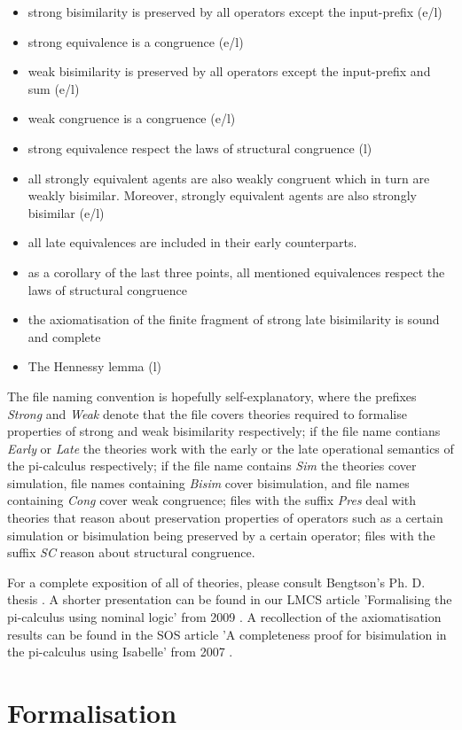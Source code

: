 \documentclass[11pt,a4paper]{article}
\begin{document}
\begin{itemize}
\item strong bisimilarity is preserved by all operators except the
  input-prefix (e/l)
\item strong equivalence is a congruence (e/l)
\item weak bisimilarity is preserved by all operators except the
  input-prefix and sum (e/l)
\item weak congruence is a congruence (e/l)
\item strong equivalence respect the laws of structural congruence (l)
\item all strongly equivalent agents are also weakly congruent which in
  turn are weakly bisimilar. Moreover, strongly equivalent agents are
  also strongly bisimilar (e/l)
\item all late equivalences are included in their early counterparts.
\item as a corollary of the last three points, all mentioned equivalences
  respect the laws of structural congruence
\item the axiomatisation of the finite fragment of strong late
  bisimilarity is sound and complete
\item The Hennessy lemma (l)
\end{itemize}

The file naming convention is hopefully self-explanatory, where the
prefixes \emph{Strong} and \emph{Weak} denote that the file covers theories
required to formalise properties of strong and weak bisimilarity
respectively; if the file name contians \emph{Early} or \emph{Late} the theories
work with the early or the late operational semantics of the
pi-calculus respectively; if the file name contains \emph{Sim} the theories
cover simulation, file names containing \emph{Bisim} cover bisimulation,
and file names containing \emph{Cong} cover weak congruence; files with the
suffix \emph{Pres} deal with theories that reason about preservation
properties of operators such as a certain simulation or bisimulation
being preserved by a certain operator; files with the suffix \emph{SC} reason
about structural congruence.

For a complete exposition of all of theories, please consult Bengtson's
Ph. D. thesis \cite{bengtson:thesis}. A shorter presentation can be found in our LMCS article
'Formalising the pi-calculus using nominal logic' from 2009 \cite{bengtson:lmcs09}. A
recollection of the axiomatisation results can be found in the SOS
article 'A completeness proof for bisimulation in the pi-calculus
using Isabelle' from 2007 \cite{bengtson:sos07}.

\section{Formalisation}





\end{document}
